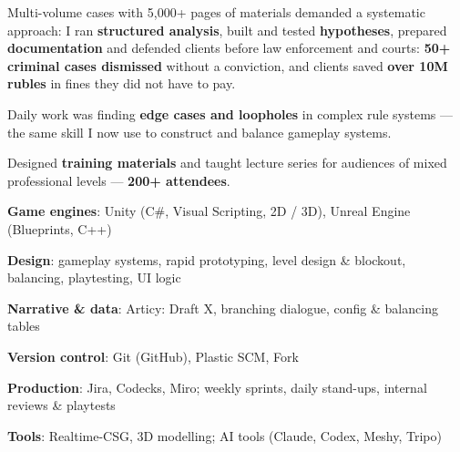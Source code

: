 \documentclass[10pt]{article}
\begin{document}
\begin{points}
  \item Multi-volume cases with 5,000+ pages of materials demanded a systematic approach: I ran \textbf{structured analysis},
        built and tested \textbf{hypotheses}, prepared \textbf{documentation} and defended clients before law enforcement and
        courts: \textbf{50+ criminal cases dismissed} without a conviction, and clients saved \textbf{over 10M rubles} in fines
        they did not have to pay.
  \item Daily work was finding \textbf{edge cases and loopholes} in complex rule systems --- the same skill I now use to
        construct and balance gameplay systems.
\end{points}
\begin{points}
  \item Designed \textbf{training materials} and taught lecture series for audiences of mixed professional levels ---
        \textbf{200+ attendees}.
\end{points}

\newpage
{}
\par
{}
\par

\begin{plainlist}
  \item \textbf{Game engines}: Unity (C\#, Visual Scripting, 2D / 3D), Unreal Engine (Blueprints, C++)
  \item \textbf{Design}: gameplay systems, rapid prototyping, level design \& blockout, balancing, playtesting, UI logic
  \item \textbf{Narrative \& data}: Articy: Draft X, branching dialogue, config \& balancing tables
  \item \textbf{Version control}: Git (GitHub), Plastic SCM, Fork
  \item \textbf{Production}: Jira, Codecks, Miro; weekly sprints, daily stand-ups, internal reviews \& playtests
  \item \textbf{Tools}: Realtime-CSG, 3D modelling; AI tools (Claude, Codex, Meshy, Tripo)
\end{plainlist}
\end{document}
